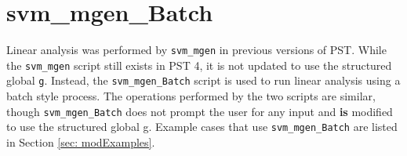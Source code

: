 \pagebreak
\section{svm\_mgen\_Batch}

Linear analysis was performed by \verb|svm_mgen| in previous versions of PST.
While the \verb|svm_mgen| script still exists in PST 4, it is not updated to use the structured global \verb|g|.
Instead, the \verb|svm_mgen_Batch| script is used to run linear analysis using a batch style process.
The operations performed by the two scripts are similar, though \verb|svm_mgen_Batch| does not prompt the user for any input and \textbf{is} modified to use the structured global g.
Example cases that use \verb|svm_mgen_Batch| are listed in Section \ref{sec: modExamples}.